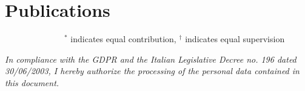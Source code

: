 \documentclass[11pt, a4paper]{moderncv}
\begin{document}
\section{Publications}





\vspace{-1.2mm}
\small{ $\quad \quad\quad\quad\quad\quad \quad^*$ indicates equal contribution, $^\dag$ indicates equal supervision}

\vfill
\enlargethispage{\footskip}
\textit{In compliance with the GDPR and the Italian Legislative Decree no. 196 dated 30/06/2003, I hereby authorize the processing of the personal data contained in this document.}
\end{document}
